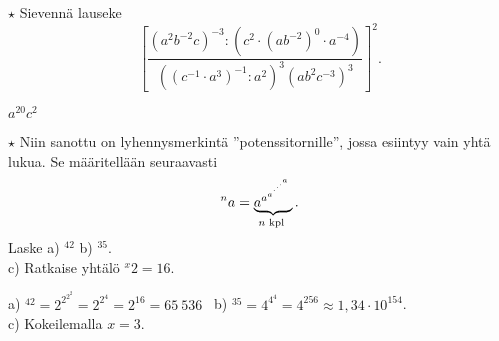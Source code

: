 \begin{tehtavasivu}
\begin{tehtava}
	\begin{vastaus}
	\end{vastaus}

\end{tehtava}

\begin{tehtava}
  		$\star$ Sievennä lauseke
$$\left[ \frac{(a^2b^{-2}c)^{-3}:\left(c^2\cdot (ab^{-2})^0 \cdot a^{-4}\right)}
{\left((c^{-1}\cdot a^3)^{-1}:a^2\right)^3(ab^2c^{-3})^3} \right]^2.$$
\begin{vastaus}
$a^{20}c^2$
\end{vastaus}
\end{tehtava} 
 
\begin{tehtava}
$\star$ Niin sanottu  on lyhennysmerkintä ''potenssitornille'',
jossa esiintyy vain yhtä lukua. Se määritellään seuraavasti
\[^na = \underbrace{{a^{a^{a^{\mathstrut^{.^{.^{.^{a}}}}}}}}}_{n\textrm{ kpl }}. \]
Laske  a) $^42$   b) $^35$. \\ c) Ratkaise yhtälö $^x2= 16$.
\begin{vastaus}
a) $^42 = 2^{2^{2^2}}=2^{2^4}=2^{16}=65\ 536$ \
b) $^35 = 4^{4^4} = 4^{256} \approx 1,34 \cdot 10^{154}$. \\
c) Kokeilemalla $x =3$.
\end{vastaus}
\end{tehtava}

\end{tehtavasivu}
